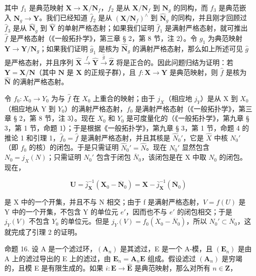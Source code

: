 其中 \(f_1\) 是典范映射 \(\mathbf{X} \to \mathbf{X} / \mathbf{N}_f\)，\(f_2\) 是从 \(\mathbf{X} / \mathbf{N}_f\) 到 \(\mathbf{N}_g\) 的同构，而 \(f_3\) 是典范嵌入 \(\mathbf{N}_g \to \mathbf{Y}\)。我们已经知道 \(\hat{f}_2\) 是从 \((\mathbf{X} / \mathbf{N}_f)^{\wedge}\) 到 \(\hat{\mathbf{N}}_g\) 的同构，并且刚才回顾过 \(\hat{f}_3\) 是从 \(\hat{\mathbf{N}}_g\) 到 \(\hat{\mathbf{Y}}\) 的单射严格态射；如果我们证明 \(\hat{f}_1\) 是满射严格态射，就可推出 \(\hat{f}\) 是严格态射（《一般拓扑学》，第三章 § 2，第 8 节，注 2）。令 \(g_1\) 为典范映射 \(\mathbf{Y} \to \mathbf{Y} / \mathbf{N}_g\)；如果我们证明 \(\hat{g}_1\) 是核为 \(\hat{\mathbf{N}}_g\) 的满射严格态射，那么如上所述可见 \(\hat{g}\) 是严格态射，并且序列 \(\hat{\mathbf{X}}\xrightarrow{f}\hat{\mathbf{Y}}\xrightarrow{\hat{g}}\hat{\mathbf{Z}}\) 将是正合的。因此问题归结为证明：若 \(\mathbf{Y}=\mathbf{X}/\mathbf{N}\)（其中 \(\mathbf{N}\) 是 \(\mathbf{X}\) 的正规子群），且 \(f\colon\mathbf{X}\to\mathbf{Y}\) 是典范映射，则 \(\hat{f}\) 是核为 \(\hat{\mathbf{N}}\) 的满射严格态射。

令 \(f_{0}: X_{0} \to Y_{0}\) 为与 \(\hat{f}\) 在 \(X_{0}\) 上重合的映射；由于 \(j_{X}\)（相应地 \(j_{Y}\)）是从 X 到 \(X_{0}\)（相应地从 Y 到 \(Y_{0}\)）的满射严格态射，\(f_{0}\) 是满射严格态射（《一般拓扑学》，第三章 § 2，第 8 节，注 3）。现在 \(X_{0}\) 和 \(Y_{0}\) 是可度量化的（《一般拓扑学》，第九章 § 3，第 1 节，命题 1）；于是根据《一般拓扑学》，第九章 § 3，第 1 节，命题 4 的推论 1 和引理 1，\(\hat{f}_{0} = \hat{f}\) 是满射严格态射，并且其核是 \(\hat{N}_{0}'\)，它是 \(\hat{X}\) 中核 \(N_{0}'\)（即 \(f_{0}\) 的核）的闭包。于是只需证明 \(\hat{N}_{0}' = \hat{N}\)。现在 \(N_{0}'\) 显然包含 \(N_{0} = j_{X}(N)\)；只需证明 \(N_{0}'\) 包含于闭包 \(\bar{N}_{0}\)，该闭包是在 X 中取 \(N_{0}\) 的闭包。现在，

\[
\mathbf {U} = \bar {j} _ {\mathbf {X}} ^ {- 1} (\mathbf {X} _ {0} - \overline {{\mathbf {N}}} _ {0}) = \mathbf {X} - \bar {j} _ {\mathbf {X}} ^ {- 1} (\overline {{\mathbf {N}}} _ {0})
\]

是 X 中的一个开集，并且不与 N 相交；由于 f 是满射严格态射，\(V = f(U)\) 是 Y 中的一个开集，不包含 Y 的单位元 \(e'\)，因而也不与 \(e'\) 的闭包相交；于是 \(j_{Y}(V)\) 不包含 \(Y_{0}\) 的单位元。但是 \(j_{Y}(V) = f_{0}(X_{0} - \overline{N}_{0})\)，所以 \(N_{0}' \subset \overline{N}_{0}\)，这就完成了引理 2 的证明。

命题 16. 设 A 是一个滤过环，\((\mathbf{A}_n)\) 是其滤过，E 是一个 A-模，且 \((\mathbf{E}_n)\) 是由 A 上的滤过导出的 E 上的滤过，由 \(\mathbf{E}_n = \mathbf{A}_n\mathbf{E}\) 组成。假设滤过 \((\mathbf{A}_n)\) 是穷竭的，且模 E 是有限生成的。如果 \(i: \mathbf{E} \to \hat{\mathbf{E}}\) 是典范映射，那么对所有 \(n \in \mathbf{Z}\)，


